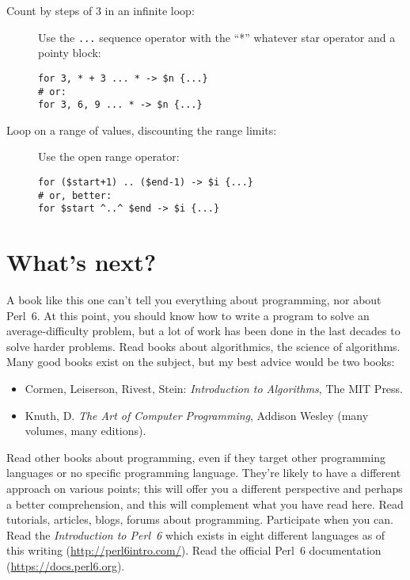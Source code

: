 \begin{description}
\item[Count by steps of 3 in an infinite loop:] Use the \verb'...' 
sequence operator with the ``*'' whatever star operator and 
a pointy block:

\begin{verbatim}
for 3, * + 3 ... * -> $n {...}
# or:
for 3, 6, 9 ... * -> $n {...}    
\end{verbatim}

\item[Loop on a range of values, discounting the range limits:] Use 
the open range operator:

\begin{verbatim}
for ($start+1) .. ($end-1) -> $i {...}
# or, better:
for $start ^..^ $end -> $i {...}
\end{verbatim}
\end{description}

\section{What's next?}

A book like this one can't tell you everything about programming,  
nor about Perl~6. At this point, you should know how to write a 
program to solve an average-difficulty problem, but a lot of work 
has been done in the last decades to solve harder problems. Read 
books about algorithmics, the science of algorithms. Many good 
books exist on the subject, but my best advice would be two books:
\begin{itemize}
\item Cormen, Leiserson, Rivest, Stein: \emph{Introduction to 
Algorithms}, The MIT Press.
\item Knuth, D. \emph{The Art of Computer Programming}, Addison Wesley 
(many volumes, many editions).
\end{itemize}

Read other books about programming, even if they 
target other programming languages or no specific programming 
language. They're likely to have a 
different approach on various points; this will offer you a 
different perspective and perhaps a better comprehension, and 
this will complement what you have read here. 
Read tutorials, articles, blogs, forums about programming. 
Participate when you can. Read the \emph{Introduction to 
Perl~6} which exists in eight different languages as of 
this writing (\url{http://perl6intro.com/}). Read the 
official Perl~6 documentation (\url{https://docs.perl6.org}).

